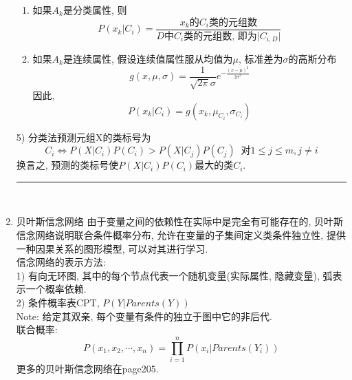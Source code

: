 \documentclass[a4paper,10pt,english]{article}
\begin{document}
\begin{enumerate}
\begin{enumerate}
\item {}
如果$A_k$是分类属性, 则$$P(x_k|C_i) = \frac{x_k\mbox{的}C_i\mbox{类的元组数}}{D\mbox{中}C_i\mbox{类的元组数, 即为} \lvert C_{i,D} \rvert }$$
\item {}
如果$A_k$是连续属性, 假设连续值属性服从均值为$\mu$, 标准差为$\sigma$的高斯分布$$ g(x, \mu, \sigma) = \frac{1}{\sqrt{2\pi}\sigma}e^{-\frac{(x-\mu)^2}{2\sigma^2}} $$ 因此, $$ P(x_k|C_i) = g(x_k, \mu_{C_i}, \sigma_{C_i})$$
\end{enumerate}
5) 分类法预测元组X的类标号为$$ C_i \Leftrightarrow P(X|C_i)P(C_i) > P(X|C_j)P(C_j) \;\; \mbox{对} 1 \leq j \leq m, j \neq i $$  换言之, 预测的类标号使$P(X|C_i)P(C_i)$最大的类$C_i$.\\
\rule{15cm}{1pt} \\

\item {贝叶斯信念网络}
由于变量之间的依赖性在实际中是完全有可能存在的, 贝叶斯信念网络说明联合条件概率分布, 允许在变量的子集间定义类条件独立性, 提供一种因果关系的图形模型, 可以对其进行学习. \\
信念网络的表示方法: \\
 1) 有向无环图, 其中的每个节点代表一个随机变量(实际属性, 隐藏变量), 弧表示一个概率依赖. \\
 2) 条件概率表CPT, $P(Y|Parents(Y))$ \\
Note: 给定其双亲, 每个变量有条件的独立于图中它的非后代. \\
联合概率: $$ P(x_1, x_2, \cdots, x_n) = \prod_{i=1}^nP(x_i|Parents(Y_i)) $$
更多的贝叶斯信念网络在page205.
\end{enumerate}
\end{document}
